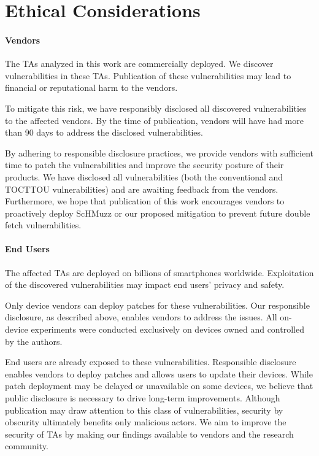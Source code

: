 \documentclass[conference]{IEEEtran}
\newcommand{\sysname}{ScHMuzz\xspace}
\begin{document}
\newpage

\appendix
\section*{Ethical Considerations}\label{sec:trash}

\paragraph{Vendors} The TAs analyzed in this work are commercially
deployed. We discover vulnerabilities in these TAs. Publication of these
vulnerabilities may lead to financial or reputational harm to the vendors.

To mitigate this risk, we have responsibly disclosed all
discovered vulnerabilities to the affected vendors. By the time of publication,
vendors will have had more than 90 days to address the disclosed vulnerabilities.

By adhering to responsible disclosure practices, we provide
vendors with sufficient time to patch the vulnerabilities and improve the
security posture of their products. We have disclosed all vulnerabilities (both 
the conventional and TOCTTOU vulnerabilities) 
and are awaiting feedback from the vendors. Furthermore, we hope
that publication of this work encourages vendors to proactively deploy \sysname
or our proposed mitigation to prevent future double fetch vulnerabilities.

\paragraph{End Users}
The affected TAs are deployed on billions of smartphones worldwide.
Exploitation of the discovered vulnerabilities may impact end users' privacy
and safety.

Only device vendors can deploy patches for these
vulnerabilities. Our responsible disclosure, as described above, enables vendors
to address the issues. All on-device experiments were conducted
exclusively on devices owned and controlled by the authors.

End users are already exposed to these vulnerabilities.
Responsible disclosure enables vendors to deploy patches and allows users to
update their devices. While patch deployment may be delayed or unavailable on
some devices, we believe that public disclosure is necessary to drive long-term
improvements. Although publication may draw attention to
this class of vulnerabilities, security by obscurity ultimately benefits only
malicious actors. We aim to improve the security of TAs by making our findings
available to vendors and the research community.
\end{document}
